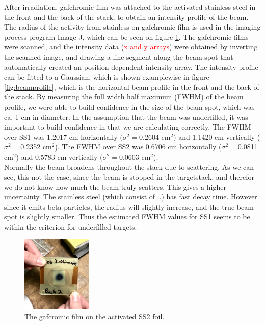 \documentclass[a4paper,11pt,twoside]{book}
\begin{document}
After irradiation, gafchromic film was attached to the activated stainless steel in the front and the back of the stack, to obtain an intensity profile of the beam. The radius of the activity from stainless on gafchromic film is used in the imaging process program Image-J, which can be seen on figure \ref{fig:SS2_gafchromic}. The gafchromic films were scanned, and the intensity data (\textcolor{red}{x and y arrays}) were obtained by inverting the scanned image, and drawing a line segment along the beam spot that automatically created an position dependent intensity array. The intensity profile can be fitted to a Gaussian, which is shown examplewise in figure \ref{fig:beamprofile}, which is the horizontal beam profile in the front and the back of the stack. By measuring the full width half maximum (FWHM) of the beam profile, we were able to build confidence in the size of the beam spot, which was ca. 1 cm in diameter. In the assumption that the beam was underfilled, it was important to build confidence in that we are calculating correctly. The FWHM over SS1 was 1.2017 cm horizontally ($\sigma^2=$0.2604 cm$^2$) and 1.1420 cm vertically ($\sigma^2=$0.2352 cm$^2$). The FWHM over SS2 was 0.6706 cm horizontally ($\sigma^2=$0.0811 cm$^2$) and 0.5783 cm vertically ($\sigma^2=$0.0603 cm$^2$). \\

Normally the beam broadens throughout the stack due to scattering. As we can see, this not the case, since the beam is stopped in the targetstack, and therefor we do not know how much the beam truly scatters. This gives a higher uncertainty.  
The stainless steel (which consist of ..) has fast decay time. However since it emits beta-particles, the radius will slightly increase, and the true beam spot is slightly smaller. Thus the estimated FWHM values for SS1  seems to be within the criterion for underfilled targets. 



\begin{figure}
    \centering
    \includegraphics[width=0.3\textwidth]{Experiment/gafchromic_beamprofile.jpg}
    \caption{The gafcromic film on the activated SS2 foil. }
    \label{fig:SS2_gafchromic}
\end{figure}
\end{document}
